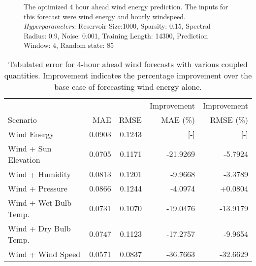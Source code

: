 \begin{figure*}[h]
  \centering
  
  \caption{The optimized 4 hour ahead wind energy prediction. The inputs for this forecast were wind energy and hourly windspeed. \textit{Hyperparameters}: Reservoir Size:1000, Sparsity: 0.15, Spectral Radius: 0.9, Noise: 0.001, Training Length: 14300, Prediction Window: 4, Random state: 85}
  \label{fig:wind04}
\end{figure*}
  \begin{table*}[h]
    \centering
    \caption{Tabulated error for 4-hour ahead wind forecasts with various coupled quantities. Improvement indicates the percentage improvement over the base case of forecasting wind energy alone.}
    \label{tab:wind04}
    \begin{tabular}{l|r|r|r|r}
      &  & & Improvement & Improvement \\
      Scenario  & MAE & RMSE & MAE (\%) & RMSE (\%)\\
      \hline
      Wind Energy & 0.0903 & 0.1243 & [-] & [-] \\
      Wind + Sun Elevation & 0.0705 & 0.1171 & -21.9269 & -5.7924 \\
      Wind + Humidity & 0.0813 & 0.1201 & -9.9668 & -3.3789 \\
      Wind + Pressure & 0.0866 & 0.1244 & -4.0974 & +0.0804 \\
      Wind + Wet Bulb Temp. & 0.0731 & 0.1070 & -19.0476 & -13.9179  \\
      Wind + Dry Bulb Temp. & 0.0747 & 0.1123 & -17.2757 & -9.9654 \\
      Wind + Wind Speed & 0.0571 & 0.0837 & -36.7663 & -32.6629 \\
    \end{tabular}
  \end{table*}
